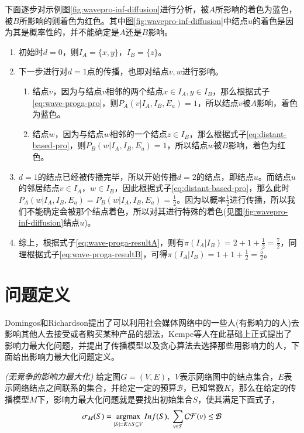 下面逐步对示例图\ref{fig:wavepro-inf-diffusion}进行分析，被$A$所影响的着色为蓝色，被$B$所影响的则着色为红色。其中\underline{图\ref{fig:wavepro-inf-diffusion}}中结点$u$的着色是因为其是概率性的，并不能确定是$A$还是$B$影响。
\begin{enumerate}
\item 初始时$d=0$，则$I_{A}=\{x, y\}$，$I_{B}=\{z\}$。
\item 下一步进行对$d=1$点的传播，也即对结点$v, w$进行影响。
\begin{enumerate}
\item 结点$v$，因为与结点$v$相邻的两个结点$x \in I_{A}, y \in I_{B}$，那么根据式子\ref{eq:wave-proga-pro}，则$P_{A}(v|I_{A}, I_{B}, E_{a})=1$，所以结点$v$被$A$影响，着色为蓝色。
\item 结点$w$，因为与结点$w$相邻的一个结点$z \in I_{B}$，那么根据式子\ref{eq:distant-based-pro}，则$P_{B}(w|I_{A}, I_{B}, E_{a})=1$，所以结点$w$被$B$影响，着色为红色。
\end{enumerate}
\item $d=1$的结点已经被传播完毕，所以开始传播$d=2$的结点，即结点$u$。而结点$u$的邻居结点$v \in I_{A}$，$w \in I_{B}$，因此根据式子\ref{eq:distant-based-pro}，那么此时$P_{A}(w|I_{A}, I_{B}, E_{a})=P_{B}(w|I_{A}, I_{B}, E_{a})=\frac{1}{2}$。因为以概率$\frac{1}{2}$进行传播，所以我们不能确定会被那个结点着色，所以对其进行特殊的着色(见\underline{图\ref{fig:wavepro-inf-diffusion}}结点$u$)。
\item 综上，根据式子\ref{eq:wave-proga-resultA}，则有$\pi(I_{A}|I_{B})=2+1+\frac{1}{2}=\frac{7}{2}$，同理根据式子\ref{eq:wave-proga-resultB}，可得$\pi(I_{A}|I_{B})=1+1+\frac{1}{2}=\frac{5}{2}$。
\end{enumerate}



\section{问题定义}
Domingos和Richardson\cite{domingos2001mining}提出了可以利用社会媒体网络中的一些人(有影响力的人)去影响其他人去接受或者购买某种产品的想法，Kempe\cite{kempe2003maximizing}等人在此基础上正式提出了影响力最大化问题，并提出了传播模型以及贪心算法去选择那些用影响力的人，下面给出影响力最大化问题定义。

\begin{definition}
\emph{(无竞争的影响力最大化)}
\label{def:noncompetitive-infmax}
给定图$G=(V, E)$，$V$表示网络图中的结点集合，$E$表示网络结点之间联系的集合，并给定一定的预算$\mathcal{B}$，已知常数$K$，那么在给定的传播模型$M$下，影响力最大化问题就是要找出初始集合$S$，使其满足下面式子，
\begin{displaymath}
\sigma_{M}(S) = \mathop{\rm argmax} \limits_{|S|=K \wedge S \subseteq V} Inf(S), ~ \sum_{v \in S} \mathcal{CF}(v) \leq \mathcal{B}
\end{displaymath}
\end{definition}

